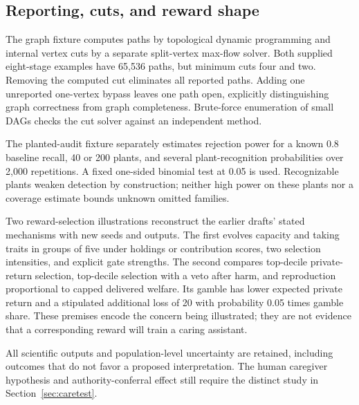 \subsection{Reporting, cuts, and reward shape}
The graph fixture computes paths by topological dynamic programming and internal vertex cuts by a separate split-vertex max-flow solver. Both supplied eight-stage examples have 65,536 paths, but minimum cuts four and two. Removing the computed cut eliminates all reported paths. Adding one unreported one-vertex bypass leaves one path open, explicitly distinguishing graph correctness from graph completeness. Brute-force enumeration of small DAGs checks the cut solver against an independent method.


The planted-audit fixture separately estimates rejection power for a known 0.8 baseline recall, 40 or 200 plants, and several plant-recognition probabilities over 2,000 repetitions. A fixed one-sided binomial test at 0.05 is used. Recognizable plants weaken detection by construction; neither high power on these plants nor a coverage estimate bounds unknown omitted families.

Two reward-selection illustrations reconstruct the earlier drafts' stated mechanisms with new seeds and outputs. The first evolves capacity and taking traits in groups of five under holdings or contribution scores, two selection intensities, and explicit gate strengths. The second compares top-decile private-return selection, top-decile selection with a veto after harm, and reproduction proportional to capped delivered welfare. Its gamble has lower expected private return and a stipulated additional loss of 20 with probability 0.05 times gamble share. These premises encode the concern being illustrated; they are not evidence that a corresponding reward will train a caring assistant.


All scientific outputs and population-level uncertainty are retained, including outcomes that do not favor a proposed interpretation. The human caregiver hypothesis and authority-conferral effect still require the distinct study in Section~\ref{sec:caretest}.
